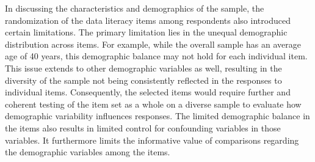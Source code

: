 \documentclass[
  12pt,
  a4paper,
  twoside]{article}
\begin{document}
In discussing the characteristics and demographics of the sample, the randomization of the data literacy items among respondents also introduced certain limitations.
The primary limitation lies in the unequal demographic distribution across items.
For example, while the overall sample has an average age of 40 years, this demographic balance may not hold for each individual item.
This issue extends to other demographic variables as well, resulting in the diversity of the sample not being consistently reflected in the responses to individual items.
Consequently, the selected items would require further and coherent testing of the item set as a whole on a diverse sample to evaluate how demographic variability influences responses.
The limited demographic balance in the items also results in limited control for confounding variables in those variables. It furthermore limits the informative value of comparisons regarding the demographic variables among the items.
\end{document}
